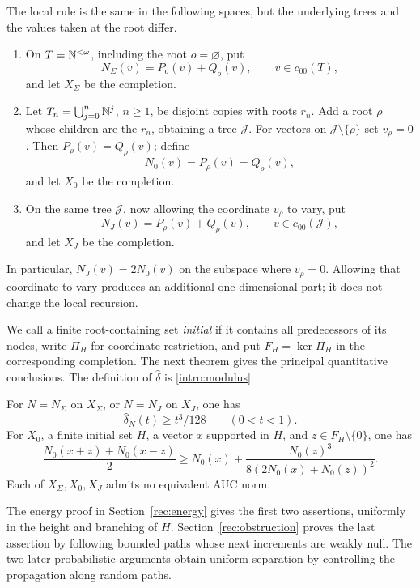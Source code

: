 The local rule is the same in the following spaces, but the underlying
trees and the values taken at the root differ.
\begin{enumerate}[label=\textup{(\roman*)}]
\item On $T=\mathbb N^{<\omega}$, including the root $o=\varnothing$, put
\[
 N_\Sigma(v)=P_o(v)+Q_o(v),\qquad v\in c_{00}(T),
\]
and let $X_\Sigma$ be the completion.
\item Let $T_n=\bigcup_{j=0}^n\mathbb N^j$, $n\ge1$, be disjoint copies with
roots $r_n$. Add a root $\rho$ whose children are the $r_n$, obtaining a
tree $\mathcal J$. For vectors on $\mathcal J\setminus\{\rho\}$ set
$v_\rho=0$. Then $P_\rho(v)=Q_\rho(v)$; define
\[
 N_0(v)=P_\rho(v)=Q_\rho(v),
\]
and let $X_0$ be the completion.
\item\label{rec:joined-sum-definition}
On the same tree $\mathcal J$, now allowing the coordinate $v_\rho$ to
vary, put
\[
 N_J(v)=P_\rho(v)+Q_\rho(v),\qquad v\in c_{00}(\mathcal J),
\]
and let $X_J$ be the completion.
\end{enumerate}
In particular, $N_J(v)=2N_0(v)$ on the subspace where $v_\rho=0$.
Allowing that coordinate to vary produces an additional one-dimensional
part; it does not change the local recursion.

We call a finite root-containing set \emph{initial} if it contains all
predecessors of its nodes, write $\Pi_H$ for coordinate restriction,
and put $F_H=\ker\Pi_H$ in the corresponding completion.
The next theorem gives the principal quantitative conclusions. The definition
of $\widehat\delta$ is \eqref{intro:modulus}.

\begin{theorem}\label{rec:main}\label{rec:joined-root-stability}
For $N=N_\Sigma$ on $X_\Sigma$, or $N=N_J$ on $X_J$, one has
\begin{equation}\label{rec:sum-modulus}
 \widehat\delta_N(t)\ge t^3/128\qquad(0<t<1).
\end{equation}
For $X_0$, a finite initial set $H$, a vector $x$ supported in $H$, and
$z\in F_H\setminus\{0\}$, one has
\begin{equation}\label{rec:equal-estimate}
 \frac{N_0(x+z)+N_0(x-z)}2\ge N_0(x)
 +\frac{N_0(z)^3}{8(2N_0(x)+N_0(z))^2}.
\end{equation}
Each of $X_\Sigma,X_0,X_J$ admits no equivalent AUC norm.
\end{theorem}

The energy proof in Section~\ref{rec:energy} gives the first two
assertions, uniformly in the height and branching of $H$.
Section~\ref{rec:obstruction} proves the last assertion by following
bounded paths whose next increments are weakly null. The two later
probabilistic arguments obtain uniform separation by controlling the
propagation along random paths.


